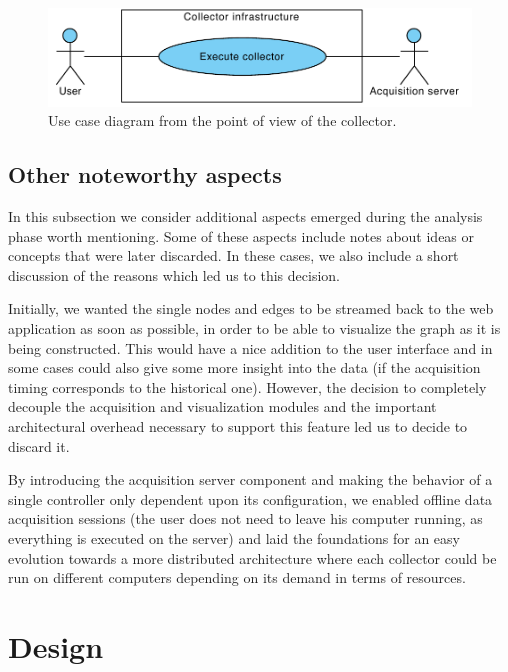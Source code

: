 \begin{figure}[p]
  \centering
  \includegraphics[width=0.67\linewidth]{images/uc-collector}
  \caption[Use case diagram for the collector.]{Use case diagram from the point of view of the collector.}
  \label{fig:uc-collector}
\end{figure}


\subsection{Other noteworthy aspects}

In this subsection we consider additional aspects emerged during the analysis phase worth mentioning. Some of these aspects include notes about ideas or concepts that were later discarded. In these cases, we also include a short discussion of the reasons which led us to this decision.

Initially, we wanted the single nodes and edges to be streamed back to the web application as soon as possible, in order to be able to visualize the graph as it is being constructed. This would have a nice addition to the user interface and in some cases could also give some more insight into the data (if the acquisition timing corresponds to the historical one). However, the decision to completely decouple the acquisition and visualization modules and the important architectural overhead necessary to support this feature led us to decide to discard it.

By introducing the acquisition server component and making the behavior of a single controller only dependent upon its configuration, we enabled offline data acquisition sessions (the user does not need to leave his computer running, as everything is executed on the server) and laid the foundations for an easy evolution towards a more distributed architecture where each collector could be run on different computers depending on its demand in terms of resources.


\section{Design}


